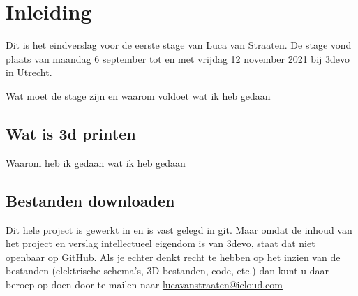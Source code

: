 \chapter{Inleiding}
\label{inleiding}

\begin{center}
    \begin{minipage}{0.5\textwidth}
        \begin{small}
            Dit is het eindverslag voor de eerste stage van Luca van Straaten.
            De stage vond plaats van maandag 6 september tot en met vrijdag 12
            november 2021 bij 3devo in Utrecht.
        \end{small}
    \end{minipage}
    \vspace{0.5cm}
\end{center}

\noindent Wat moet de stage zijn en waarom voldoet wat ik heb gedaan

\section{Wat is 3d printen}

Waarom heb ik gedaan wat ik heb gedaan

\section{Bestanden downloaden}

Dit hele project is gewerkt in en is vast gelegd in git. Maar omdat de inhoud
van het project en verslag intellectueel eigendom is van 3devo, staat dat niet
openbaar op GitHub. Als je echter denkt recht te hebben op het inzien van de
bestanden (elektrische schema's, 3D bestanden, code, etc.) dan kunt u daar
beroep op doen door te mailen naar
\href{mailto:lucavanstraaten@icloud.com}{lucavanstraaten@icloud.com}
